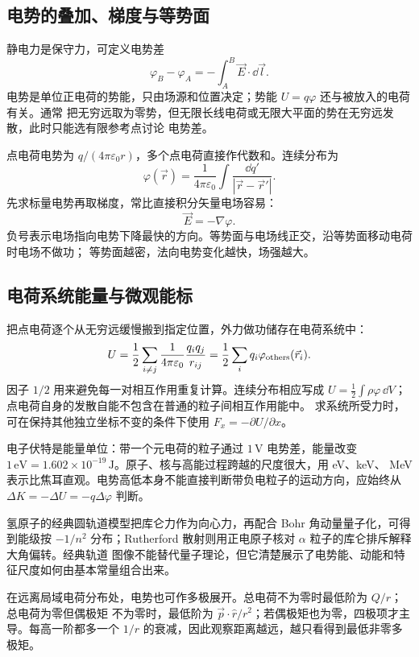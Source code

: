 \subsection*{电势的叠加、梯度与等势面}

静电力是保守力，可定义电势差
\[
 \varphi_B-\varphi_A=-\int_A^B\vec E\cdot\dd\vec l.
\]
电势是单位正电荷的势能，只由场源和位置决定；势能 $U=q\varphi$ 还与被放入的电荷有关。通常
把无穷远取为零势，但无限长线电荷或无限大平面的势在无穷远发散，此时只能选有限参考点讨论
电势差。

点电荷电势为 $q/(4\pi\varepsilon_0r)$，多个点电荷直接作代数和。连续分布为
\[
 \varphi(\vec r)=\frac1{4\pi\varepsilon_0}
 \int\frac{\dd q'}{|\vec r-\vec r'|}.
\]
先求标量电势再取梯度，常比直接积分矢量电场容易：
\[
 \vec E=-\nabla\varphi.
\]
负号表示电场指向电势下降最快的方向。等势面与电场线正交，沿等势面移动电荷时电场不做功；
等势面越密，法向电势变化越快，场强越大。

\subsection*{电荷系统能量与微观能标}

把点电荷逐个从无穷远缓慢搬到指定位置，外力做功储存在电荷系统中：
\[
 U=\frac12\sum_{i\ne j}
 \frac1{4\pi\varepsilon_0}\frac{q_iq_j}{r_{ij}}
 =\frac12\sum_iq_i\varphi_{\rm others}(\vec r_i).
\]
因子 $1/2$ 用来避免每一对相互作用重复计算。连续分布相应写成
$U=\tfrac12\int\rho\varphi\,\dd V$；点电荷自身的发散自能不包含在普通的粒子间相互作用能中。
求系统所受力时，可在保持其他独立坐标不变的条件下使用 $F_x=-\partial U/\partial x$。

电子伏特是能量单位：带一个元电荷的粒子通过 $1\,\mathrm V$ 电势差，能量改变
$1\,\mathrm{eV}=1.602\times10^{-19}\,\mathrm J$。原子、核与高能过程跨越的尺度很大，用 eV、keV、
MeV 表示比焦耳直观。电势高低本身不能直接判断带负电粒子的运动方向，应始终从
$\Delta K=-\Delta U=-q\Delta\varphi$ 判断。

氢原子的经典圆轨道模型把库仑力作为向心力，再配合 Bohr 角动量量子化，可得到能级按
$-1/n^2$ 分布；Rutherford 散射则用正电原子核对 $\alpha$ 粒子的库仑排斥解释大角偏转。经典轨道
图像不能替代量子理论，但它清楚展示了电势能、动能和特征尺度如何由基本常量组合出来。

在远离局域电荷分布处，电势也可作多极展开。总电荷不为零时最低阶为 $Q/r$；总电荷为零但偶极矩
不为零时，最低阶为 $\vec p\cdot\hat r/r^2$；若偶极矩也为零，四极项才主导。每高一阶都多一个
$1/r$ 的衰减，因此观察距离越远，越只看得到最低非零多极矩。

